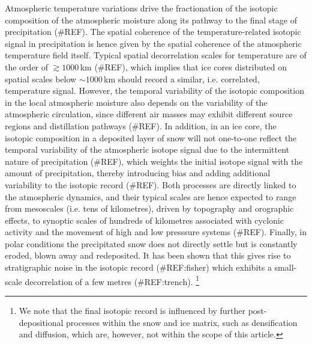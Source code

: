 \documentclass[cp, manuscript]{copernicus}
\begin{document}
Atmospheric temperature variations drive the fractionation of the isotopic
composition of the atmospheric moisture along its pathway to the final stage of
precipitation (\#REF). The spatial coherence of the temperature-related isotopic
signal in precipitation is hence given by the spatial coherence of the
atmospheric temperature field itself. Typical spatial decorrelation scales for
temperature are of the order of $\gtrsim1000$\,km (\#REF), which implies that
ice cores distributed on spatial scales below $\sim 1000$\,km should record a
similar, i.e. correlated, temperature signal. However, the temporal variability
of the isotopic composition in the local atmospheric moisture also depends on
the variability of the atmospheric circulation, since different air masses may
exhibit different source regions and distillation pathways (\#REF). In addition,
in an ice core, the isotopic composition in a deposited layer of snow will not
one-to-one reflect the temporal variability of the atmospheric isotope signal
due to the intermittent nature of precipitation (\#REF), which weights the
initial isotope signal with the amount of precipitation, thereby introducing
bias and adding additional variability to the isotopic record (\#REF). Both
processes are directly linked to the atmospheric dynamics, and their typical
scales are hence expected to range from mesoscales (i.e. tens of kilometres),
driven by topography and orographic effects, to synoptic scales of hundreds of
kilometres associated with cyclonic activity and the movement of high and low
presssure systems (\#REF). Finally, in polar conditions the precipitated snow
does not directly settle but is constantly eroded, blown away and
redeposited. It has been shown that this gives rise to stratigraphic noise in
the isotopic record (\#REF:fisher) which exhibits a small-scale decorrelation of
a few metres (\#REF:trench).%
\footnote{We note that the final isotopic record is influenced by further
  post-depositional processes within the snow and ice matrix, such as
  densification and diffusion, which are, however, not within the scope of this
  article.}
\end{document}
